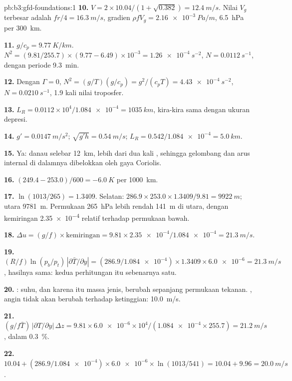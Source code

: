 \begin{solution}{pb:b3:gfd-foundations:1}
\textbf{10.} $V = 2\times10.04/(1 + \sqrt{0.382}) = \qty{12.4}{m/s}$. Nilai
$V_g$ terbesar adalah $fr/4 = \qty{16.3}{m/s}$, gradien $\rho fV_g =
\qty{2.16e-3}{Pa/m}$, \qty{6.5}{hPa} per \qty{300}{km}.

\textbf{11.} $g/c_p = \qty{9.77}{K/km}$. $N^2 = (9.81/255.7)\times(9.77 -
6.49)\times10^{-3} = \qty{1.26e-4}{s^{-2}}$, $N = \qty{0.0112}{s^{-1}}$, dengan
periode \qty{9.3}{min}.

\textbf{12.} Dengan $\Gamma = 0$, $N^2 = (g/T)(g/c_p) = g^2/(c_pT) =
\qty{4.43e-4}{s^{-2}}$, $N = \qty{0.0210}{s^{-1}}$, 1.9 kali
nilai troposfer.

\textbf{13.} $L_R = 0.0112\times10^4/\num{1.084e-4} = \qty{1035}{km}$, kira-kira
sama dengan ukuran depresi.

\textbf{14.} $g' = \qty{0.0147}{m/s^2}$; $\sqrt{g'h} = \qty{0.54}{m/s}$;
$L_R = 0.542/\num{1.084e-4} = \qty{5.0}{km}$.

\textbf{15.} Ya: danau selebar \qty{12}{km}, lebih dari dua kali
, sehingga gelombang dan arus internal di dalamnya dibelokkan oleh
gaya Coriolis.

\textbf{16.} $(249.4 - 253.0)/600 = \qty{-6.0}{K}$ per \qty{1000}{km}.

\textbf{17.} $\ln(1013/265) = 1.3409$. Selatan:
$286.9\times253.0\times1.3409/9.81 = \qty{9922}{m}$; utara \qty{9781}{m}.
Permukaan \qty{265}{hPa} lebih rendah \qty{141}{m} di utara, dengan kemiringan
\num{2.35e-4} relatif terhadap permukaan bawah.

\textbf{18.} $\Delta u = (g/f)\times\text{kemiringan} = 9.81\times\num{2.35e-4}/
\num{1.084e-4} = \qty{21.3}{m/s}$.

\textbf{19.} $(R/f)\ln(p_b/p_t)\,|\partial\bar T/\partial y| =
(286.9/\num{1.084e-4})\times1.3409\times\num{6.0e-6} = \qty{21.3}{m/s}$, hasilnya
sama: kedua perhitungan itu sebenarnya satu.

\textbf{20.} : suhu, dan karena itu massa jenis, berubah sepanjang
permukaan tekanan. , angin tidak akan berubah terhadap ketinggian:
\qty{10.0}{m/s}.

\textbf{21.} $(g/f\bar T)\,|\partial T/\partial y|\,\Delta z = 9.81\times
\num{6.0e-6}\times10^4/(\num{1.084e-4}\times255.7) = \qty{21.2}{m/s}$,
dalam \qty{0.3}{\percent}.

\textbf{22.} $10.04 + (286.9/\num{1.084e-4})\times\num{6.0e-6}\times
\ln(1013/541) = 10.04 + 9.96 = \qty{20.0}{m/s}$.


\end{solution}
